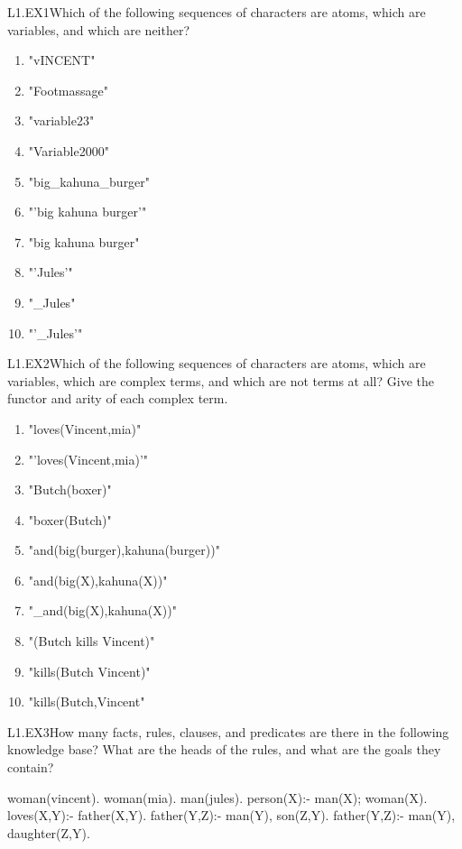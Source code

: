 \begin{LPNexercise}{L1.EX1}Which of the following sequences of
  characters are atoms, which are variables, and which are neither?

\begin{enumerate}
\item{}"vINCENT"
\item{}"Footmassage"
\item{}"variable23"
\item{}"Variable2000"
\item{}"big\_kahuna\_burger"
\item{}"'big kahuna burger'"
\item{}"big kahuna burger"
\item{}"'Jules'"
\item{}"\_Jules"
\item{}"'\_Jules'"
\end{enumerate}
\end{LPNexercise}

\begin{LPNexercise}{L1.EX2}Which of the following sequences of
  characters are atoms, which
  are variables, which are complex terms, and which are not terms at
  all?  Give the functor and arity of each complex term.

\begin{enumerate}
\item{}"loves(Vincent,mia)"
\item{}"'loves(Vincent,mia)'"
\item{}"Butch(boxer)"
\item{}"boxer(Butch)"
\item{}"and(big(burger),kahuna(burger))"
\item{}"and(big(X),kahuna(X))"
\item{}"\_and(big(X),kahuna(X))"
\item{}"(Butch kills Vincent)"
\item{}"kills(Butch Vincent)"
\item{}"kills(Butch,Vincent"
\end{enumerate}
\end{LPNexercise}

\begin{LPNexercise}{L1.EX3}How many facts, rules, clauses, and predicates are there in the
following knowledge base?  What are the heads of the rules, and what
are the goals they contain?

\begin{LPNcodedisplay}
woman(vincent).
woman(mia).
man(jules).
person(X):- man(X); woman(X).
loves(X,Y):- father(X,Y).
father(Y,Z):- man(Y), son(Z,Y).
father(Y,Z):- man(Y), daughter(Z,Y).
\end{LPNcodedisplay}
\end{LPNexercise}

